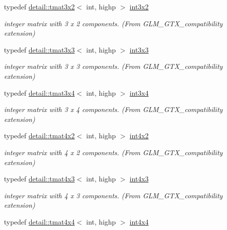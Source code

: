 \begin{DoxyCompactItemize}
typedef \hyperlink{structglm_1_1detail_1_1tmat3x2}{detail\+::tmat3x2}$<$ int, highp $>$ \hyperlink{group__gtx__compatibility_ga2b1f3046fb4692c0c2f76b3933389868}{int3x2}
\begin{DoxyCompactList}\small\item\em integer matrix with 3 x 2 components. (From G\+L\+M\+\_\+\+G\+T\+X\+\_\+compatibility extension) \end{DoxyCompactList}\item 
typedef \hyperlink{structglm_1_1detail_1_1tmat3x3}{detail\+::tmat3x3}$<$ int, highp $>$ \hyperlink{group__gtx__compatibility_ga8773c9f240dcac9f28d1afef71f7f779}{int3x3}
\begin{DoxyCompactList}\small\item\em integer matrix with 3 x 3 components. (From G\+L\+M\+\_\+\+G\+T\+X\+\_\+compatibility extension) \end{DoxyCompactList}\item 
typedef \hyperlink{structglm_1_1detail_1_1tmat3x4}{detail\+::tmat3x4}$<$ int, highp $>$ \hyperlink{group__gtx__compatibility_ga7cb1c0960d6551c34c666ad5829e9c65}{int3x4}
\begin{DoxyCompactList}\small\item\em integer matrix with 3 x 4 components. (From G\+L\+M\+\_\+\+G\+T\+X\+\_\+compatibility extension) \end{DoxyCompactList}\item 
typedef \hyperlink{structglm_1_1detail_1_1tmat4x2}{detail\+::tmat4x2}$<$ int, highp $>$ \hyperlink{group__gtx__compatibility_gac391157aca117c5d52b10c2c3ca5c9be}{int4x2}
\begin{DoxyCompactList}\small\item\em integer matrix with 4 x 2 components. (From G\+L\+M\+\_\+\+G\+T\+X\+\_\+compatibility extension) \end{DoxyCompactList}\item 
typedef \hyperlink{structglm_1_1detail_1_1tmat4x3}{detail\+::tmat4x3}$<$ int, highp $>$ \hyperlink{group__gtx__compatibility_gaa80ec1b785920a08d366b3c09859d888}{int4x3}
\begin{DoxyCompactList}\small\item\em integer matrix with 4 x 3 components. (From G\+L\+M\+\_\+\+G\+T\+X\+\_\+compatibility extension) \end{DoxyCompactList}\item 
typedef \hyperlink{structglm_1_1detail_1_1tmat4x4}{detail\+::tmat4x4}$<$ int, highp $>$ \hyperlink{group__gtx__compatibility_ga5f8072c2dce67ad49939e12b168d1de1}{int4x4}

\end{DoxyCompactItemize}
